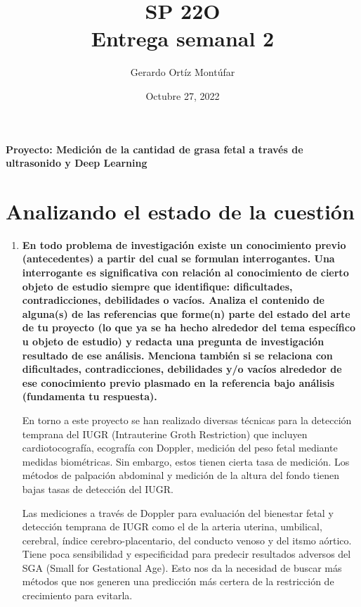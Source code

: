 


\title{\textbf{SP 22O\\Entrega semanal 2}}
\author{Gerardo Ortíz Montúfar}
\date{Octubre 27, 2022}


\maketitle

\textbf{Proyecto: Medición de la cantidad de grasa fetal a través
de ultrasonido y Deep Learning}

\section{Analizando el estado de la cuestión}

\begin{enumerate}
	\item \textbf{En todo problema de investigación existe un conocimiento previo (antecedentes) a partir del cual se
formulan interrogantes. Una interrogante es significativa con relación al conocimiento de cierto objeto
de estudio siempre que identifique: dificultades, contradicciones, debilidades o vacíos. Analiza el
contenido de alguna(s) de las referencias que forme(n) parte del estado del arte de tu proyecto (lo que
ya se ha hecho alrededor del tema específico u objeto de estudio) y redacta una pregunta de
investigación resultado de ese análisis. Menciona también si se relaciona con dificultades,
contradicciones, debilidades y/o vacíos alrededor de ese conocimiento previo plasmado en la referencia
bajo análisis (fundamenta tu respuesta).}
	
	\vspace{5mm}
	En torno a este proyecto se han realizado diversas
	técnicas para la detección temprana del IUGR (Intrauterine
	Groth Restriction) que incluyen cardiotocografía, ecografía
	con Doppler, medición del peso fetal mediante medidas
	biométricas. Sin embargo, estos tienen cierta tasa de 
	medición.
	Los métodos de palpación abdominal y medición de la altura 
	del fondo  tienen bajas tasas de detección del IUGR. 
	
	Las 
	mediciones a través de Doppler para evaluación del bienestar
	fetal y detección temprana de IUGR como el de la 
	arteria uterina, umbilical, cerebral, índice 
	cerebro-placentario, del conducto venoso y del itsmo aórtico.
	Tiene poca sensibilidad y especificidad para predecir
	resultados adversos del SGA (Small for Gestational Age)\citep{sharma2016intrauterine}.
	Esto nos da la necesidad de buscar más métodos que nos generen
	una predicción más certera de la restricción de crecimiento
	para evitarla.
	

\end{enumerate}
